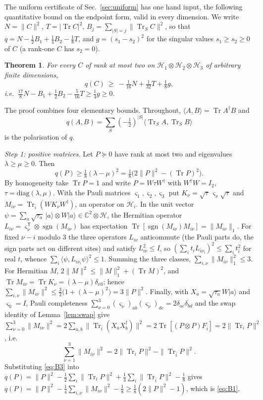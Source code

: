 \documentclass[aps,pra,twocolumn,superscriptaddress,nofootinbib,longbibliography]{revtex4-2}
\newcommand{\C}{\mathbb C}
\newcommand{\Hh}{\mathcal H}
\newcommand{\ip}[2]{\langle #1,#2\rangle}
\newcommand{\ket}[1]{|#1\rangle}
\DeclareMathOperator{\Tr}{Tr}
\newcommand{\T}{\mathsf T}
\theoremstyle{plain}
\newtheorem{theorem}{Theorem}[section]
\theoremstyle{definition}
\theoremstyle{remark}
\begin{document}
The uniform certificate of Sec.~\ref{sec:uniform} has one hand input, the following quantitative bound on the endpoint form, valid in every dimension. We write $N=\|C\|^2$, $T=|\Tr C|^2$, $B_j=\sum_{|S|=j}\|\Tr_SC\|^2$, so that $q=N-\tfrac12B_1+\tfrac14B_2-\tfrac18T$, and $g=(s_1-s_2)^2$ for the singular values $s_1\ge s_2\ge0$ of $C$ (a rank-one $C$ has $s_2=0$).

\begin{theorem}\label{thm:bound}
For every $C$ of rank at most two on $\Hh_1\otimes\Hh_2\otimes\Hh_3$ of arbitrary finite dimensions,
\begin{equation}\label{eq:bound}
q(C)\ \ge\ -\tfrac1{16}N+\tfrac1{32}T+\tfrac18g ,
\end{equation}
i.e.\ $\tfrac{17}8N-B_1+\tfrac12B_2-\tfrac5{16}T\ge\tfrac14g\ge0$.
\end{theorem}

The proof combines four elementary bounds. Throughout, $\ip AB=\Tr A^\dagger B$ and
\[q(A,B)=\sum_S(-\tfrac12)^{|S|}\ip{\Tr_SA}{\Tr_SB}\]
is the polarisation of $q$.

\emph{Step 1: positive matrices.} Let $P\succeq0$ have rank at most two and eigenvalues $\lambda\ge\mu\ge0$. Then
\begin{equation}\label{eq:B1}
q(P)\ge\tfrac18(\lambda-\mu)^2=\tfrac18\bigl(2\|P\|^2-(\Tr P)^2\bigr).
\end{equation}
By homogeneity take $\Tr P=1$ and write $P=W\tau W^\dagger$ with $W^\dagger W=I_2$, $\tau=\mathrm{diag}(\lambda,\mu)$. With the Pauli matrices $\varsigma_1,\varsigma_2,\varsigma_3$ put $K_\nu=\sqrt\tau\,\varsigma_\nu\sqrt\tau$ and $M_{i\nu}=\Tr_{\bar i}(WK_\nu W^\dagger)$, an operator on $\Hh_i$. In the unit vector $\psi=\sum_a\sqrt{\tau_a}\,\ket a\otimes W\ket a\in\C^2\otimes\Hh$, the Hermitian operator $L_{i\nu}=\varsigma_\nu^\T\otimes\operatorname{sgn}(M_{i\nu})$ has expectation $\Tr[\operatorname{sgn}(M_{i\nu})M_{i\nu}]=\|M_{i\nu}\|_1$. For fixed $\nu-i$ modulo $3$ the three operators $L_{i\nu}$ anticommute (the Pauli parts do, the sign parts act on different sites) and satisfy $L_{i\nu}^2\le I$, so $(\sum_it_iL_{i\nu_i})^2\le\sum_it_i^2$ for real $t$, whence $\sum_i\ip\psi{L_{i\nu_i}\psi}^2\le1$. Summing the three classes, $\sum_{i,\nu}\|M_{i\nu}\|_1^2\le3$. For Hermitian $M$, $2\|M\|^2\le\|M\|_1^2+(\Tr M)^2$, and $\Tr M_{i\nu}=\Tr K_\nu=(\lambda-\mu)\delta_{\nu3}$; hence $\sum_{i,\nu}\|M_{i\nu}\|^2\le\tfrac32\bigl(1+(\lambda-\mu)^2\bigr)=3\|P\|^2$. Finally, with $X_a=\sqrt{\tau_a}W\ket a$ and $\varsigma_0=I$, Pauli completeness $\sum_{\nu=0}^3(\varsigma_\nu)_{ab}(\varsigma_\nu)_{dc}=2\delta_{ac}\delta_{bd}$ and the swap identity of Lemma~\ref{lem:swap} give $\sum_{\nu=0}^3\|M_{i\nu}\|^2=2\sum_{a,b}\|\Tr_{\bar i}(X_aX_b^\dagger)\|^2=2\Tr[(P\otimes P)F_{\bar i}]=2\|\Tr_iP\|^2$, i.e.
\begin{equation}\label{eq:B3}
\textstyle\sum_{\nu=1}^3\|M_{i\nu}\|^2=2\|\Tr_iP\|^2-\|\Tr_{\bar i}P\|^2 .
\end{equation}
Substituting \eqref{eq:B3} into $q(P)=\|P\|^2-\tfrac12\sum_i\|\Tr_iP\|^2+\tfrac14\sum_i\|\Tr_{\bar i}P\|^2-\tfrac18$ gives $q(P)=\|P\|^2-\tfrac14\sum_{i,\nu}\|M_{i\nu}\|^2-\tfrac18\ge\tfrac18(2\|P\|^2-1)$, which is \eqref{eq:B1}.
\end{document}
